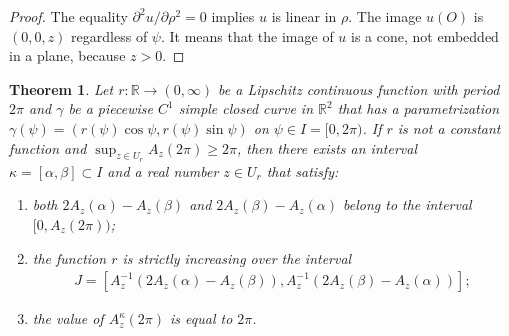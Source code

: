 \documentclass{amsart}
\theoremstyle{plain}
\newtheorem{theorem}{Theorem}[section]
\theoremstyle{definition}
\theoremstyle{remark}
\begin{document}
\begin{proof}%
The equality $\partial^2u/\partial\rho^2=0$ implies $u$ is linear in $\rho$.
The image $u(O)$ is $(0,0,z)$ regardless of $\psi$.
It means that the image of $u$ is a cone, not embedded in a plane, because $z>0$. 
\end{proof}







\begin{theorem}\label{4.3} %
Let $r \colon \mathbb{R}\to(0,\infty)$ be a Lipschitz continuous function with period $2\pi$ and $\gamma$ be a piecewise $C^1$ simple closed curve in $\mathbb{R}^2$ that has a parametrization $\gamma(\psi)=(r(\psi)\cos\psi,r(\psi)\sin\psi)$ on $\psi\in I=[0,2\pi)$. 
If $r$ is not a constant function and $\sup_{z\in U_r}A_z(2\pi)\ge2\pi$, then there exists an interval $\kappa=[\alpha,\beta]\subset I$ and a real number $z\in U_r$ that satisfy:
\begin{enumerate}
\item both $2A_z(\alpha)-A_z(\beta)$ and $2A_z(\beta)-A_z(\alpha)$ belong to the interval $[0,A_z(2\pi))$;
\item the function $r$ is strictly increasing over the interval 
\begin{align*} 
J=[A_z^{-1}(2A_z(\alpha)-A_z(\beta)),A_z^{-1}(2A_z(\beta)-A_z(\alpha))];
\end{align*} 
\item the value of $A_z^{\kappa}(2\pi)$ is equal to $2\pi$.
\end{enumerate}
\end{theorem}
\end{document}
